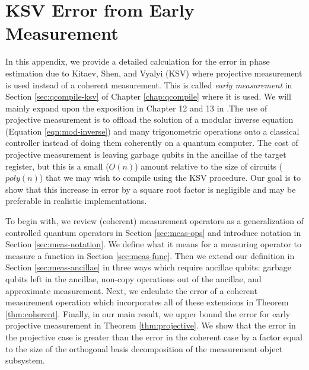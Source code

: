 \chapter{KSV Error from Early Measurement}
\label{app:ksv-error}

In this appendix, we provide a detailed calculation for the error in
phase estimation due to Kitaev, Shen, and Vyalyi (KSV) where projective
measurement is used instead of a coherent measurement. This is called
\emph{early measurement} in Section \ref{sec:qcompile-ksv} of
Chapter \ref{chap:qcompile} where it is used.
We will mainly expand
upon
the exposition in Chapter 12 and 13 in \cite{Kitaev2002}.The use
of projective measurement is to offload the solution of a
modular inverse equation (Equation \ref{eqn:mod-inverse})
and many trigonometric operations
onto a classical controller instead of doing them coherently on a quantum
computer. The cost of projective measurement is leaving garbage qubits in
the ancillae of the target register, but this is a small ($O(n)$)
amount relative to
the size of circuits ($poly(n)$) that we may wish to compile using the KSV procedure.
Our goal is to show that this increase in error by a square root
factor is negligible and may be preferable in realistic implementations.

To begin with, we review (coherent) measurement operators as a generalization of
controlled quantum operators in Section \ref{sec:meas-ops} and introduce
notation in Section \ref{sec:meas-notation}.
We define what it means for a measuring operator to measure a function
in Section \ref{sec:meas-func}. Then we extend our definition in
Section \ref{sec:meas-ancillae} in three ways which require ancillae
qubits: garbage qubits left in the ancillae, non-copy operations
out of the ancillae, and approximate measurement.
Next, we calculate the error of a coherent measurement operation which
incorporates all of these extensions in Theorem \ref{thm:coherent}.
Finally, in our main result, we upper bound the error for
early projective measurement in Theorem \ref{thm:projective}.
We show that the error in the projective case is greater than the
error in the coherent case by a factor equal to the size of
the orthogonal basis decomposition of the measurement object subsystem.






